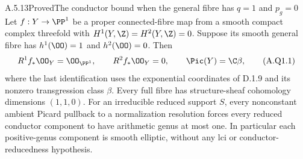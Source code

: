 \begin{statement}{A.5.13}{Proved}{The conductor bound when the general fibre has $q=1$ and $p_g=0$}
Let $f:Y\to\PP^1$ be a proper connected-fibre map from
a smooth compact complex threefold with
$H^1(Y,\Z)=H^2(Y,\Z)=0$. Suppose its smooth general
fibre has $h^1(\OO)=1$ and $h^2(\OO)=0$.
Then
\[
 R^1f_*\OO_Y=\OO_{\PP^1},\qquad R^2f_*\OO_Y=0,
 \qquad\Pic(Y)=\C\beta,                            \tag{A.Q1.1}
\]
where the last identification uses the exponential
coordinates of D.1.9 and its nonzero transgression
class $\beta$. Every full fibre has structure-sheaf
cohomology dimensions $(1,1,0)$.
For an irreducible reduced support $S$, every
nonconstant ambient Picard pullback to a normalization
resolution forces every reduced conductor component
to have arithmetic genus at most one. In particular
each positive-genus component is smooth elliptic,
without any lci or conductor-reducedness hypothesis.
\end{statement}
